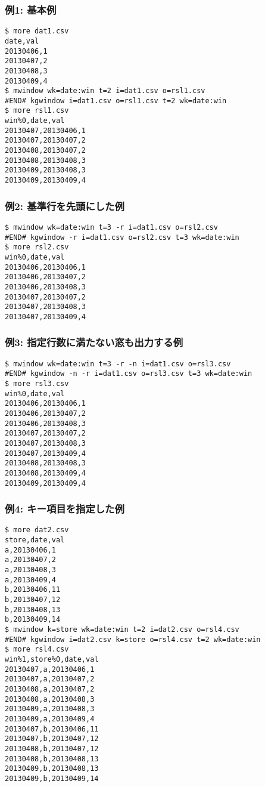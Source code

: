 \subsubsection*{例1: 基本例}



\begin{Verbatim}[baselinestretch=0.7,frame=single]
$ more dat1.csv
date,val
20130406,1
20130407,2
20130408,3
20130409,4
$ mwindow wk=date:win t=2 i=dat1.csv o=rsl1.csv
#END# kgwindow i=dat1.csv o=rsl1.csv t=2 wk=date:win
$ more rsl1.csv
win%0,date,val
20130407,20130406,1
20130407,20130407,2
20130408,20130407,2
20130408,20130408,3
20130409,20130408,3
20130409,20130409,4
\end{Verbatim}
\subsubsection*{例2: 基準行を先頭にした例}



\begin{Verbatim}[baselinestretch=0.7,frame=single]
$ mwindow wk=date:win t=3 -r i=dat1.csv o=rsl2.csv
#END# kgwindow -r i=dat1.csv o=rsl2.csv t=3 wk=date:win
$ more rsl2.csv
win%0,date,val
20130406,20130406,1
20130406,20130407,2
20130406,20130408,3
20130407,20130407,2
20130407,20130408,3
20130407,20130409,4
\end{Verbatim}
\subsubsection*{例3: 指定行数に満たない窓も出力する例}



\begin{Verbatim}[baselinestretch=0.7,frame=single]
$ mwindow wk=date:win t=3 -r -n i=dat1.csv o=rsl3.csv
#END# kgwindow -n -r i=dat1.csv o=rsl3.csv t=3 wk=date:win
$ more rsl3.csv
win%0,date,val
20130406,20130406,1
20130406,20130407,2
20130406,20130408,3
20130407,20130407,2
20130407,20130408,3
20130407,20130409,4
20130408,20130408,3
20130408,20130409,4
20130409,20130409,4
\end{Verbatim}
\subsubsection*{例4: キー項目を指定した例}



\begin{Verbatim}[baselinestretch=0.7,frame=single]
$ more dat2.csv
store,date,val
a,20130406,1
a,20130407,2
a,20130408,3
a,20130409,4
b,20130406,11
b,20130407,12
b,20130408,13
b,20130409,14
$ mwindow k=store wk=date:win t=2 i=dat2.csv o=rsl4.csv
#END# kgwindow i=dat2.csv k=store o=rsl4.csv t=2 wk=date:win
$ more rsl4.csv
win%1,store%0,date,val
20130407,a,20130406,1
20130407,a,20130407,2
20130408,a,20130407,2
20130408,a,20130408,3
20130409,a,20130408,3
20130409,a,20130409,4
20130407,b,20130406,11
20130407,b,20130407,12
20130408,b,20130407,12
20130408,b,20130408,13
20130409,b,20130408,13
20130409,b,20130409,14
\end{Verbatim}
